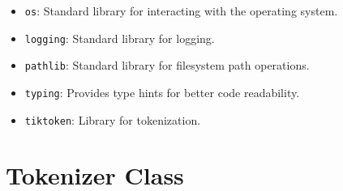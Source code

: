 \begin{itemize}
    \item \texttt{os}: Standard library for interacting with the operating system.
    \item \texttt{logging}: Standard library for logging.
    \item \texttt{pathlib}: Standard library for filesystem path operations.
    \item \texttt{typing}: Provides type hints for better code readability.
    \item \texttt{tiktoken}: Library for tokenization.
\end{itemize}

\section{Tokenizer Class}

